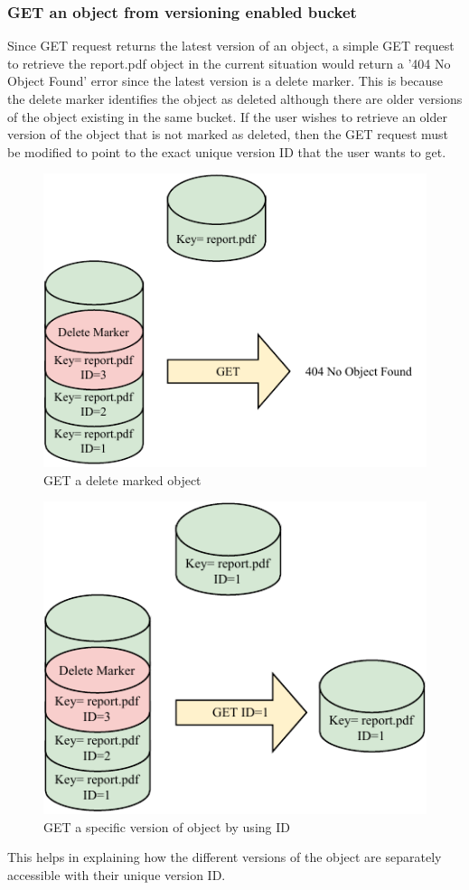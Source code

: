 \documentclass{home_assignment}
\begin{document}
    \subsubsection{GET an object from versioning enabled bucket}
    Since GET request returns the latest version of an object, a simple GET request to retrieve the report.pdf object in the current situation would return a '404 No Object Found' error since the latest version is a delete marker. This is because the delete marker identifies the object as deleted although there are older versions of the object existing in the same bucket. If the user wishes to retrieve an older version of the object that is not marked as deleted, then the GET request must be modified to point to the exact unique version ID that the user wants to get.
    \begin{figure}[H]
        \centering
        \includegraphics[scale=1.3]{../Figures/versioning_get}
        \caption{GET a delete marked object}
        \label{fig:get}
    \end{figure}

    \begin{figure}[H]
        \centering
        \includegraphics[scale=1.3]{../Figures/versioning_get_id}
        \caption{GET a specific version of object by using ID}
        \label{fig:get_id}
    \end{figure}
    This helps in explaining how the different versions of the object are separately accessible with their unique version ID.
\end{document}

